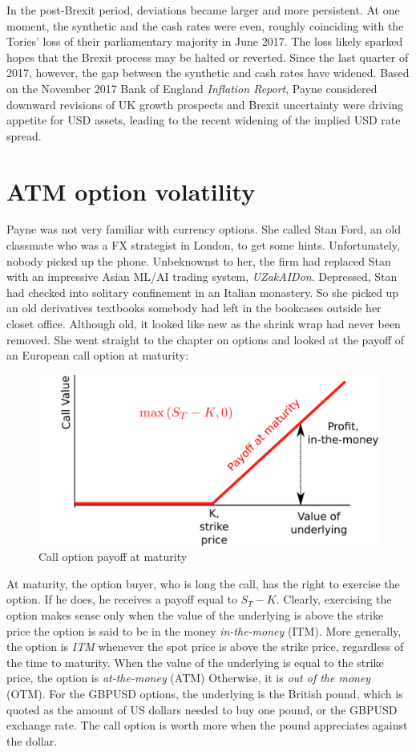 \documentclass[]{book}
\theoremstyle{definition}
\theoremstyle{definition}
\theoremstyle{definition}
\theoremstyle{remark}
\begin{document}
In the post-Brexit period, deviations became larger and more persistent.
At one moment, the synthetic and the cash rates were even, roughly
coinciding with the Tories' loss of their parliamentary majority in June
2017. The loss likely sparked hopes that the Brexit process may be
halted or reverted. Since the last quarter of 2017, however, the gap
between the synthetic and cash rates have widened. Based on the November
2017 Bank of England \emph{Inflation Report}, Payne considered downward
revisions of UK growth prospects and Brexit uncertainty were driving
appetite for USD assets, leading to the recent widening of the implied
USD rate spread.

\section{ATM option volatility}\label{atm-option-volatility}

Payne was not very familiar with currency options. She called Stan Ford,
an old classmate who was a FX strategist in London, to get some hints.
Unfortunately, nobody picked up the phone. Unbeknownst to her, the firm
had replaced Stan with an impressive Asian ML/AI trading system,
\emph{UZakAIDon}. Depressed, Stan had checked into solitary confinement
in an Italian monastery. So she picked up an old derivatives textbooks
somebody had left in the bookcases outside her closet office. Although
old, it looked like new as the shrink wrap had never been removed. She
went straight to the chapter on options and looked at the payoff of an
European call option at maturity:

\hypertarget{figure-call-option}{}
\begin{figure}
\includegraphics[width=0.7\linewidth]{images/figCallOptionMaturity} \caption{Call option payoff at maturity}\label{fig:unnamed-chunk-11}
\end{figure}

At maturity, the option buyer, who is long the call, has the right to
exercise the option. If he does, he receives a payoff equal to
\(S_T -K\). Clearly, exercising the option makes sense only when the
value of the underlying is above the strike price the option is said to
be in the money \emph{in-the-money} (ITM). More generally, the option is
\emph{ITM} whenever the spot price is above the strike price, regardless
of the time to maturity. When the value of the underlying is equal to
the strike price, the option is \emph{at-the-money} (ATM) Otherwise, it
is \emph{out of the money} (OTM). For the GBPUSD options, the underlying
is the British pound, which is quoted as the amount of US dollars needed
to buy one pound, or the GBPUSD exchange rate. The call option is worth
more when the pound appreciates against the dollar.
\end{document}

